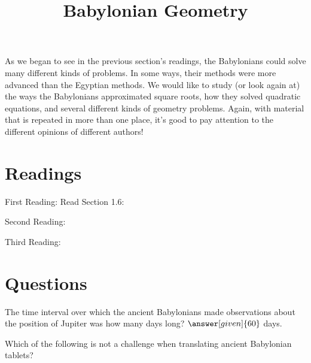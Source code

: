 \documentclass{ximera}
\title{Babylonian Geometry}
\begin{document}
\begin{abstract}
\end{abstract}
\maketitle

As we began to see in the previous section's readings, the Babylonians could solve many different kinds of problems. 
In some ways, their methods were more advanced than the Egyptian methods.  We would like to study (or look again at) 
the ways the Babylonians approximated square roots, how they solved quadratic equations, and several different kinds 
of geometry problems.  Again, with material that is repeated in more than one place, it's good to pay attention to 
the different opinions of different authors!




\section{Readings}

First Reading: Read Section 1.6: 

Second Reading: 

Third Reading: 




\section{Questions}

\begin{question}
The time interval over which the ancient Babylonians made observations about the position of Jupiter was how many days long?  $\answer[given]{60}$ days.
\end{question}


\begin{question}
Which of the following is not a challenge when translating ancient Babylonian tablets?
\begin{multipleChoice}
\end{multipleChoice}
\end{question}


%
\end{document}
